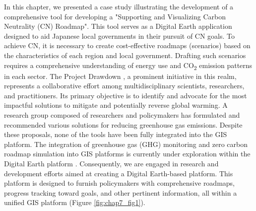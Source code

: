 In this chapter, we presented a case study illustrating the development of a comprehensive tool for developing a "Supporting and Visualizing Carbon Neutrality (CN) Roadmap". This tool serves as a Digital Earth application designed to aid Japanese local governments in their pursuit of CN goals. To achieve CN, it is necessary to create cost-effective roadmaps (scenarios) based on the characteristics of each region and local government. Drafting such scenarios requires a comprehensive understanding of energy use and CO\textsubscript{2} emission patterns in each sector. The Project Drawdown \citep{brennan2020project}, a prominent initiative in this realm, represents a collaborative effort among multidisciplinary scientists, researchers, and practitioners. Its primary objective is to identify and advocate for the most impactful solutions to mitigate and potentially reverse global warming. A research group composed of researchers and policymakers has formulated and recommended various solutions for reducing greenhouse gas emissions. Despite these proposals, none of the tools have been fully integrated into the GIS platform. The integration of greenhouse gas (GHG) monitoring and zero carbon roadmap simulation into GIS platforms is currently under exploration within the Digital Earth platform \citep{fukui2021digital}. Consequently, we are engaged in research and development efforts aimed at creating a Digital Earth-based platform. This platform is designed to furnish policymakers with comprehensive roadmaps, progress tracking toward goals, and other pertinent information, all within a unified GIS platform (Figure \ref{fig:chap7_fig1}). \par

